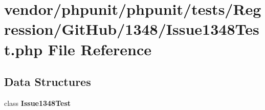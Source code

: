 \section{vendor/phpunit/phpunit/tests/\+Regression/\+Git\+Hub/1348/\+Issue1348\+Test.php File Reference}
\label{_issue1348_test_8php}
\subsection*{Data Structures}
\begin{DoxyCompactItemize}
\item 
class {\bf Issue1348\+Test}
\end{DoxyCompactItemize}
